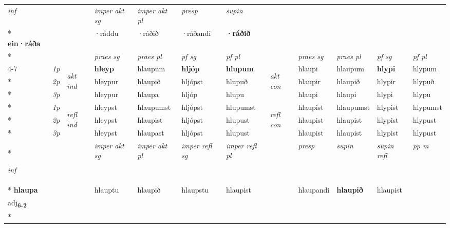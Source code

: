 \begin{longtable}[l]{X>{\footnotesize\itshape}llXXXXlXXXX}
   {\textit{inf}} & &  & \textit{imper akt sg} & \textit{imper akt pl}   & \textit{presp} & \textit{supin}   \\*
  {\textbf{ein\allowbreak ·ráða}} & && ·ráddu  & ·ráðið   & ·ráðandi &  \textbf{·ráðið}   \\*

\midrule

 & &   & \textit{praes sg}  & \textit{praes pl}    & \textit{ pf sg} & \textit{pf pl} & & \textit{praes sg}  & \textit{praes pl}    & \textit{pf sg} & \textit{pf pl }  \\ \cmidrule{4-7} \cmidrule{9-12}
 \multirow{2}{*}{{{\textbf{v{\textsubscript{6}}} \Large{\textbf{90}}}}}  & 1p & \multirow{3}{*}{\begin{turn}{90}\textit{akt ind}\end{turn}} & \textbf{hleyp} & hlaupum & \textbf{hljóp} & \textbf{hlupum} & \multirow{3}{*}{\begin{turn}{90}\textit{akt con}\end{turn}} &hlaupi & hlaupum & \textbf{hlypi} & hlypum\\*
 & 2p &  &  hleypur  & hlaupið & hljópst & hlupuð & & hlaupir & hlaupið & hlypir & hlypuð \\*
 & 3p &  & hleypur & hlaupa & hljóp & hlupu & & hlaupi & hlaupi& hlypi & hlypu \\*
\cmidrule{4-7} \cmidrule{9-12}
 & 1p & \multirow{3}{*}{\begin{turn}{90}\textit{refl ind}\end{turn}}  & hleypst & hlaupumst & hljópst & hlupumst & \multirow{3}{*}{\begin{turn}{90}\textit{refl con}\end{turn}}  &hlaupist & hlaupumst & hlypist & hlypumst \\*
 & 2p &  & hleypst & hlaupist & hljópst & hlupust & &hlaupist & hlaupist & hlypist & hlypust \\*
 & 3p  & & hleypst & hlaupast & hljópst & hlupust & & hlaupist & hlaupist& hlypist & hlypust \\*
\cmidrule{4-7} \cmidrule{9-12}

   {\textit{inf}} & &  & \textit{imper akt sg} & \textit{imper akt pl} & \textit{imper refl sg} & \textit{imper refl pl} && \textit{presp} & \textit{supin} & \textit{supin refl} & \textit{pp m} \\*
  {\textbf{hlaupa}} & && hlauptu  & hlaupið & hlaupstu & hlaupist && hlaupandi &  \textbf{hlaupið} & hlaupist & \specialcell{\textbf{hlaupinn} \\ adj\textbf{\textsubscript{6-2}}} \\*


\end{longtable}
